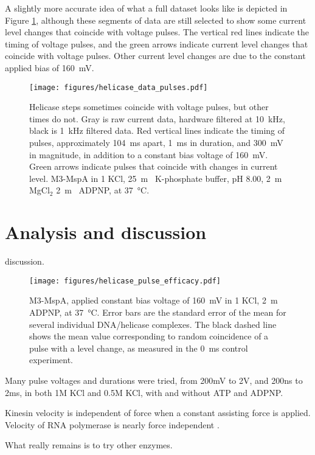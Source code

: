 A slightly more accurate idea of what a full dataset looks like is depicted in Figure \ref{fig:helicase_pulse_traces}, although these segments of data are still selected to show some current level changes that coincide with voltage pulses.  The vertical red lines indicate the timing of voltage pulses, and the green arrows indicate current level changes that coincide with voltage pulses.  Other current level changes are due to the constant applied bias of \SI{160}{\mV}.

\begin{figure}[h]
\begin{centering}
\texttt{[image: figures/helicase\_data\_pulses.pdf]}
\caption[A fraction of pulses move the helicase]{Helicase steps sometimes coincide with voltage pulses, but other times do not.  Gray is raw current data, hardware filtered at \SI{10}{\kHz}, black is \SI{1}{\kHz} filtered data.  Red vertical lines indicate the timing of pulses, approximately \SI{104}{\ms} apart, \SI{1}{\ms} in duration, and \SI{300}{\mV} in magnitude, in addition to a constant bias voltage of \SI{160}{\mV}.  Green arrows indicate pulses that coincide with changes in current level. M3-MspA in \SI{1}{\Molar} KCl, \SI{25}{\m\Molar} K-phosphate buffer, pH \num{8.00}, \SI{2}{\m\Molar} MgCl$_2$ \SI{2}{\m\Molar} ADPNP, at \SI{37}{\celsius}.}
\label{fig:helicase_pulse_traces}
\end{centering}
\end{figure}

\section{Analysis and discussion}

discussion.

\begin{figure}[h]
\begin{centering}
\texttt{[image: figures/helicase\_pulse\_efficacy.pdf]}
\caption[Quantifying efficacy of pulses]{M3-MspA, applied constant bias voltage of \SI{160}{\mV} in \SI{1}{\Molar} KCl, \SI{2}{\m\Molar} ADPNP, at \SI{37}{\celsius}.  Error bars are the standard error of the mean for several individual DNA/helicase complexes.  The black dashed line shows the mean value corresponding to random coincidence of a pulse with a level change, as measured in the \SI{0}{\ms} control experiment.}
\label{fig:helicase_pulse_efficacy}
\end{centering}
\end{figure}

Many pulse voltages and durations were tried, from 200mV to 2V, and 200ns to 2ms, in both 1M KCl and 0.5M KCl, with and without ATP and ADPNP.

Kinesin velocity is independent of force when a constant assisting force is applied.  Velocity of RNA polymerase is nearly force independent \citep{Bustamante2004}.

What really remains is to try other enzymes.

